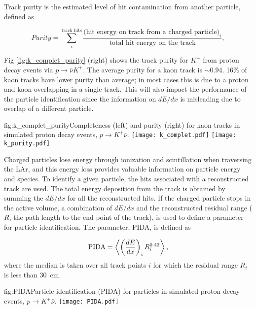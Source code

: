 Track purity is the estimated level of hit contamination from another particle, defined as

\begin{equation}
Purity = \sum_{i}^{\mbox{track hits}}\frac{\mbox{(hit energy on track from a charged particle)}_{i}}{\mbox{total hit energy on the track}},
\end{equation}

Fig \ref{fig:k_complet_purity} (right) shows the track purity for $K^{+}$ from proton decay events via $p\rightarrow \bar{\nu}K^{+}$. The average purity for a kaon track is $\sim0.94$. 
16$\%$ of kaon tracks have lower purity than average; in most cases this is due to a proton and kaon overlapping in a single track. This will also impact the performance of the particle identification since the information on $dE/dx$ is misleading due to overlap of a different particle. 

\begin{dunefigure}{fig:k_complet_purity}{Completeness (left) and purity (right) for kaon tracks in simulated proton decay events, $p\rightarrow K^{+} \bar{\nu}$.}
\texttt{[image: k\_complet.pdf]}
\texttt{[image: k\_purity.pdf]}
\end{dunefigure}

Charged particles lose energy through ionization and scintillation when traversing the LAr, and this energy loss provides valuable information on particle energy and species. To identify a given particle, the hits associated with a reconstructed track are used.
The total energy deposition from the track is obtained by summing the $dE/dx$ for all the reconstructed hits. 
If the charged particle stops in the \lartpc active volume, a combination of $dE/dx$ and the reconstructed residual range ($R$, the path length to the end point of the track), is used to define a parameter for particle identification.  The parameter, PIDA, is defined as  

\begin{equation}
\textnormal{PIDA} = \left\langle \left(\frac{dE}{dx}\right)_{i}R^{0.42}_{i}\right\rangle,\label{eqn:PIDA}
\end{equation}
where the median is taken over all track points $i$ for which the residual range $R_i$ is less than 30~cm.

\begin{dunefigure}{fig:PIDA}{Particle identification (PIDA) for particles in simulated proton decay events, $p\rightarrow K^{+} \bar{\nu}$.}
\texttt{[image: PIDA.pdf]}
\end{dunefigure}

